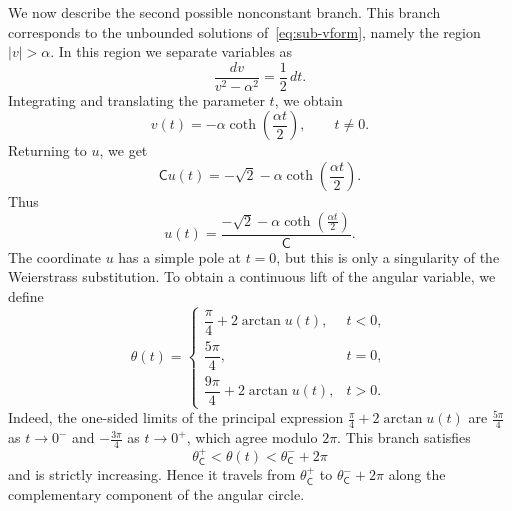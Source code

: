 \documentclass[11pt,a4paper]{amsart}
\theoremstyle{plain}
\theoremstyle{remark}
\newcommand{\C}{\mathsf{C}}
\begin{document}
We now describe the second possible nonconstant branch. This branch corresponds
to the unbounded solutions of~\eqref{eq:sub-vform}, namely the region
$|v|>\alpha$. In this region we separate variables as
\begin{equation}\label{eq:sub-sep-coth}
\frac{dv}{v^{2}-\alpha^{2}}
=
\frac{1}{2}\,dt.
\end{equation}
Integrating and translating the parameter $t$, we obtain
\begin{equation}\label{eq:v-coth}
v(t)
=
-\alpha
\operatorname{coth}\left(\frac{\alpha t}{2}\right),
\qquad
t\neq 0.
\end{equation}
Returning to $u$, we get
\begin{equation}\label{eq:sub-u-coth}
\C u(t)
=
-\sqrt{2}
-
\alpha
\operatorname{coth}\left(\frac{\alpha t}{2}\right).
\end{equation}
Thus
\begin{equation}\label{eq:u-coth-explicit}
u(t)
=
\frac{
-\sqrt{2}
-
\alpha
\operatorname{coth}\left(\frac{\alpha t}{2}\right)
}{\C}.
\end{equation}
The coordinate $u$ has a simple pole at $t=0$, but this is only a singularity of the Weierstrass substitution. To obtain a continuous lift of the angular variable, we define \[ \theta(t)= \begin{cases} \dfrac{\pi}{4}+2\arctan u(t), & t<0,\\[6pt] \dfrac{5\pi}{4}, & t=0,\\[6pt] \dfrac{9\pi}{4}+2\arctan u(t), & t>0. \end{cases} \] Indeed, the one-sided limits of the principal expression $\frac{\pi}{4}+2\arctan u(t)$ are $\frac{5\pi}{4}$ as $t\to0^-$ and $-\frac{3\pi}{4}$ as $t\to0^+$, which agree modulo $2\pi$.
This branch satisfies
\[
\theta_{\C}^{+}<\theta(t)<\theta_{\C}^{-}+2\pi
\]
and is strictly increasing. Hence it travels from $\theta_{\C}^{+}$ to
$\theta_{\C}^{-}+2\pi$ along the complementary component of the angular circle.
\end{document}

